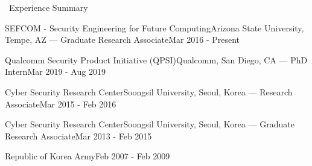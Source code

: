 \documentclass{resume} %
\begin{document}

\begin{rSection}{\faGenderless~Experience Summary}

	\begin{rSubsection2}
		{SEFCOM - {\small Security Engineering for Future Computing}}{Arizona State University, Tempe, AZ}
		{--- Graduate Research Associate}{Mar 2016 - Present}
	\end{rSubsection2}
    \vspace{-3mm}
   
    \begin{rSubsection2}
        {Qualcomm Security Product Initiative (QPSI)}{Qualcomm, San Diego, CA}
        {--- PhD Intern}{Mar 2019 - Aug 2019}
    \end{rSubsection2}
    \vspace{-3mm}

	\begin{rSubsection2}
		{Cyber Security Research Center}{Soongsil University, Seoul, Korea}
		{--- Research Associate}{Mar 2015 - Feb 2016}
	\end{rSubsection2}
	\vspace{-3mm}
	\begin{rSubsection2}
		{Cyber Security Research Center}{Soongsil University, Seoul, Korea}
		{--- Graduate Research Associate}{Mar 2013 - Feb 2015}
	\end{rSubsection2}
	\vspace{-3mm}

	\begin{rSubsection2}
		{Republic of Korea Army}{Feb 2007 - Feb 2009}
		{}{}
	\end{rSubsection2}

\end{rSection}

\end{document}
